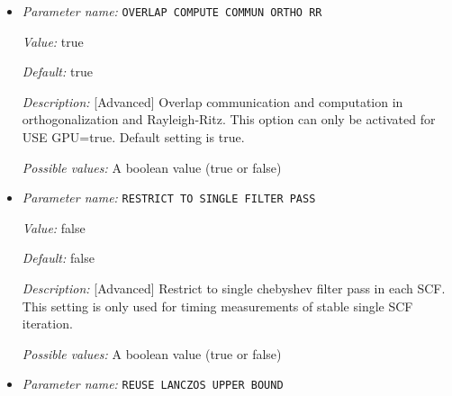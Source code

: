 \begin{itemize}
{\it Value:} true


{\it Default:} true


{\it Description:} [Advanced] Overlap communication and computation in Chebyshev filtering. This option can only be activated for USE GPU=true. Default setting is true.


{\it Possible values:} A boolean value (true or false)
\item {\it Parameter name:} {\tt OVERLAP COMPUTE COMMUN ORTHO RR}
\label{parameters:SCF parameters/Eigen_2dsolver parameters/OVERLAP COMPUTE COMMUN ORTHO RR}
\label{parameters:SCF_20parameters/Eigen_2dsolver_20parameters/OVERLAP_20COMPUTE_20COMMUN_20ORTHO_20RR}


{\it Value:} true


{\it Default:} true


{\it Description:} [Advanced] Overlap communication and computation in orthogonalization and Rayleigh-Ritz. This option can only be activated for USE GPU=true. Default setting is true.


{\it Possible values:} A boolean value (true or false)
\item {\it Parameter name:} {\tt RESTRICT TO SINGLE FILTER PASS}
\label{parameters:SCF parameters/Eigen_2dsolver parameters/RESTRICT TO SINGLE FILTER PASS}
\label{parameters:SCF_20parameters/Eigen_2dsolver_20parameters/RESTRICT_20TO_20SINGLE_20FILTER_20PASS}


{\it Value:} false


{\it Default:} false


{\it Description:} [Advanced] Restrict to single chebyshev filter pass in each SCF. This setting is only used for timing measurements of stable single SCF iteration.


{\it Possible values:} A boolean value (true or false)
\item {\it Parameter name:} {\tt REUSE LANCZOS UPPER BOUND}
\label{parameters:SCF parameters/Eigen_2dsolver parameters/REUSE LANCZOS UPPER BOUND}
\label{parameters:SCF_20parameters/Eigen_2dsolver_20parameters/REUSE_20LANCZOS_20UPPER_20BOUND}



\end{itemize}
